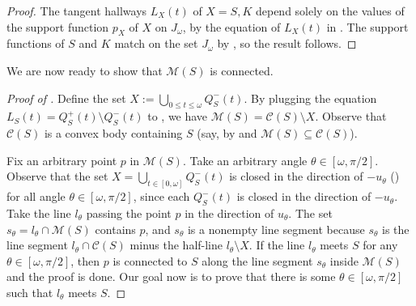 \begin{proof}
The tangent hallways \(L_X(t)\) of \(X = S, K\) depend solely on the values of the support function \(p_X\) of \(X\) on \(J_\omega\), by the equation of \(L_X(t)\) in . The support functions of \(S\) and \(K\) match on the set \(J_\omega\) by , so the result follows.
\end{proof}

We are now ready to show that \(\mathcal{M}(S)\) is connected.

\begin{proof}[Proof of ]
Define the set \(X := \bigcup_{0 \leq t \leq \omega} Q^-_S(t)\). By plugging the equation \(L_S(t) = Q_S^+(t) \setminus Q_S^-(t)\) to , we have \(\mathcal{M}(S) = \mathcal{C}(S) \setminus X\). Observe that \(\mathcal{C}(S)\) is a convex body containing \(S\) (say, by  and \(\mathcal{M}(S) \subseteq \mathcal{C}(S)\)).

Fix an arbitrary point \(p\) in \(\mathcal{M}(S)\). Take an arbitrary angle \(\theta \in [\omega, \pi/2]\). Observe that the set \(X = \bigcup_{t \in [0, \omega]} Q^-_S(t)\) is closed in the direction of \(-u_\theta\) () for all angle \(\theta \in [\omega, \pi/2]\), since each \(Q_S^-(t)\) is closed in the direction of \(-u_\theta\). Take the line \(l_\theta\) passing the point \(p\) in the direction of \(u_\theta\). The set \(s_\theta = l_\theta \cap \mathcal{M}(S)\) contains \(p\), and \(s_\theta\) is a nonempty line segment because \(s_\theta\) is the line segment \(l_\theta \cap \mathcal{C}(S)\) minus the half-line \(l_\theta \setminus X\). If the line \(l_\theta\) meets \(S\) for any \(\theta \in [\omega, \pi/2]\), then \(p\) is connected to \(S\) along the line segment \(s_\theta\) inside \(\mathcal{M}(S)\) and the proof is done. Our goal now is to prove that there is some \(\theta \in [\omega, \pi/2]\) such that \(l_\theta\) meets \(S\).


\end{proof}
